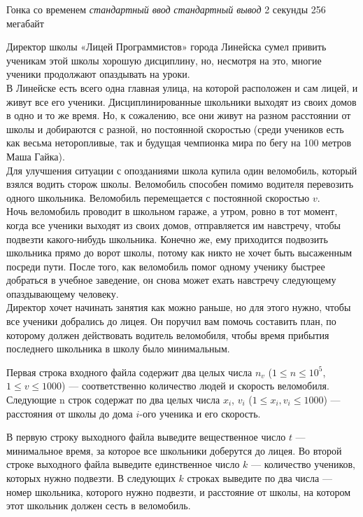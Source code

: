 \begin{problem}%
{Гонка со временем}%
{\textsl{стандартный ввод}}%
{\textsl{стандартный вывод}}%
{2 секунды}%
{256 мегабайт}{}

Директор школы «Лицей Программистов» города Линейска сумел привить ученикам этой школы хорошую дисциплину, но, несмотря на это, многие ученики продолжают опаздывать на уроки.\\

В Линейске есть всего одна главная улица, на которой расположен и сам лицей, и живут все его ученики. Дисциплинированные школьники выходят из своих домов в одно и то же время. Но, к сожалению, все они живут на разном расстоянии от школы и добираются с разной, но постоянной скоростью (среди учеников есть как весьма неторопливые, так и будущая чемпионка мира по бегу на 100 метров Маша Гайка).\\

Для улучшения ситуации с опозданиями школа купила один веломобиль, который взялся водить сторож школы. Веломобиль способен помимо водителя перевозить одного школьника. Веломобиль перемещается с постоянной скоростью $v$.\\

Ночь веломобиль проводит в школьном гараже, а утром, ровно в тот момент, когда все ученики выходят из своих домов, отправляется им навстречу, чтобы подвезти какого-нибудь школьника. Конечно же, ему приходится подвозить школьника прямо до ворот школы, потому как никто не хочет быть высаженным посреди пути. После того, как веломобиль помог одному ученику быстрее добраться в учебное заведение, он снова может ехать навстречу следующему опаздывающему человеку.\\

Директор хочет начинать занятия как можно раньше, но для этого нужно, чтобы все ученики добрались до лицея. Он поручил вам помочь составить план, по которому должен действовать водитель веломобиля, чтобы время прибытия последнего школьника в школу было минимальным.\\

\InputFile

Первая строка входного файла содержит два целых числа $n_v$ ($1 \le n \le 10^5$, $1 \le v \le 1000$) — соответственно количество людей и скорость веломобиля. Следующие n строк содержат по два целых числа $x_i$, $v_i$ ($1 \le x_i, v_i \le 1000$) — расстояния от школы до дома $i$-ого ученика и его скорость.

\OutputFile

В первую строку выходного файла выведите вещественное число $t$ — минимальное время, за которое все школьники доберутся до лицея. Во второй строке выходного файла выведите единственное число $k$ — количество учеников, которых нужно подвезти. В следующих $k$ строках выведите по два числа — номер школьника, которого нужно подвезти, и расстояние от школы, на котором этот школьник должен сесть в веломобиль.\\


\end{problem}
